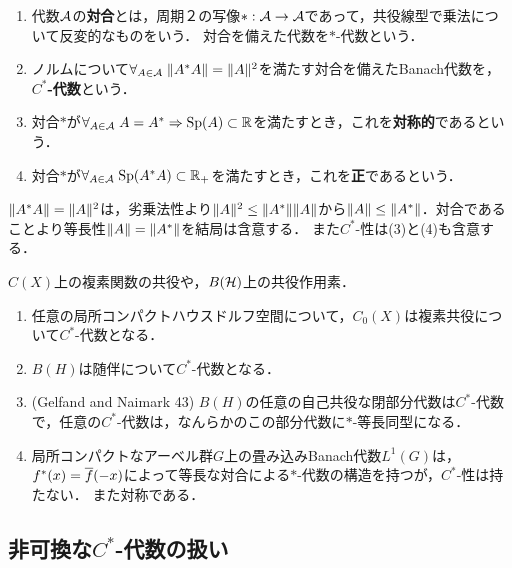 \documentclass[uplatex,dvipdfmx]{jsreport}
\begin{document}
\begin{definition}\mbox{}
    \begin{enumerate}
        \item 代数$\mathcal{A}$の\textbf{対合}とは，周期２の写像$*:\mathcal{A}\to\mathcal{A}$であって，共役線型で乗法について反変的なものをいう．
        対合を備えた代数を$*$-代数という．
        \item ノルムについて$\forall_{A\in\mathcal{A}}\;\|A^*A\|=\|A\|^2$を満たす対合を備えたBanach代数を，\textbf{$C^*$-代数}という．
        \item 対合$*$が$\forall_{A\in\mathcal{A}}\;A=A^*\Rightarrow\mathrm{Sp}(A)\subset\mathbb{R}$を満たすとき，これを\textbf{対称的}であるという．
        \item 対合$*$が$\forall_{A\in\mathcal{A}}\;\mathrm{Sp}(A^*A)\subset\mathbb{R}_+$を満たすとき，これを\textbf{正}であるという．
    \end{enumerate}
\end{definition}
\begin{remarks}[$C^*$-性は強い条件]
    $\|A^*A\|=\|A\|^2$は，劣乗法性より$\|A\|^2\le\|A^*\|\|A\|$から$\|A\|\le\|A^*\|$．対合であることより等長性$\|A\|=\|A^*\|$を結局は含意する．
    また$C^*$-性は(3)と(4)も含意する．
\end{remarks}
\begin{example}[involution]
    $C(X)$上の複素関数の共役や，$B(\mathcal{H})$上の共役作用素．
\end{example}
\begin{example}[$C^*$-代数]\mbox{}\label{exp-C*-algebra}
    \begin{enumerate}
        \item 任意の局所コンパクトハウスドルフ空間について，$C_0(X)$は複素共役について$C^*$-代数となる．
        \item $B(H)$は随伴について$C^*$-代数となる．
        \item (Gelfand and Naimark 43) $B(H)$の任意の自己共役な閉部分代数は$C^*$-代数で，任意の$C^*$-代数は，なんらかのこの部分代数に$*$-等長同型になる．
        \item 局所コンパクトなアーベル群$G$上の畳み込みBanach代数$L^1(G)$は，$f^*(x)=\overline{f}(-x)$によって等長な対合による$*$-代数の構造を持つが，$C^*$-性は持たない．
        また対称である．
    \end{enumerate}
\end{example}

\subsection{非可換な$C^*$-代数の扱い}
\end{document}
